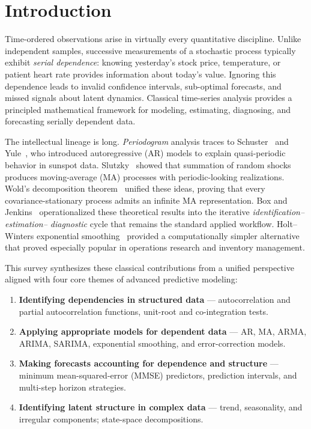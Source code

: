 \documentclass[conference]{IEEEtran}
\theoremstyle{definition}
\begin{document}
\section{Introduction}
\label{sec:intro}

Time-ordered observations arise in virtually every quantitative discipline.
Unlike independent samples, successive measurements of a stochastic process
typically exhibit \emph{serial dependence}: knowing yesterday's stock price,
temperature, or patient heart rate provides information about today's value.
Ignoring this dependence leads to invalid confidence intervals, sub-optimal
forecasts, and missed signals about latent dynamics. Classical time-series
analysis provides a principled mathematical framework for modeling, estimating,
diagnosing, and forecasting serially dependent data.

The intellectual lineage is long. \emph{Periodogram} analysis traces to
Schuster~\cite{schuster1898investigation} and Yule~\cite{yule1927periodicity},
who introduced autoregressive (AR) models to explain quasi-periodic behavior
in sunspot data. Slutzky~\cite{slutzky1927summation} showed that summation of
random shocks produces moving-average (MA) processes with periodic-looking
realizations. Wold's decomposition theorem~\cite{wold1938study} unified these
ideas, proving that every covariance-stationary process admits an infinite MA
representation. Box and Jenkins~\cite{box2015time} operationalized these
theoretical results into the iterative \emph{identification--estimation--%
diagnostic} cycle that remains the standard applied workflow. Holt--Winters
exponential smoothing~\cite{holt2004forecasting,winters1960forecasting}
provided a computationally simpler alternative that proved especially popular
in operations research and inventory management.

This survey synthesizes these classical contributions from a unified perspective
aligned with four core themes of advanced predictive modeling:
\begin{enumerate}
  \item \textbf{Identifying dependencies in structured data} --- autocorrelation
        and partial autocorrelation functions, unit-root and co-integration
        tests.
  \item \textbf{Applying appropriate models for dependent data} --- AR, MA,
        ARMA, ARIMA, SARIMA, exponential smoothing, and error-correction models.
  \item \textbf{Making forecasts accounting for dependence and structure} ---
        minimum mean-squared-error (MMSE) predictors, prediction intervals, and
        multi-step horizon strategies.
  \item \textbf{Identifying latent structure in complex data} --- trend,
        seasonality, and irregular components; state-space decompositions.
\end{enumerate}
\end{document}
